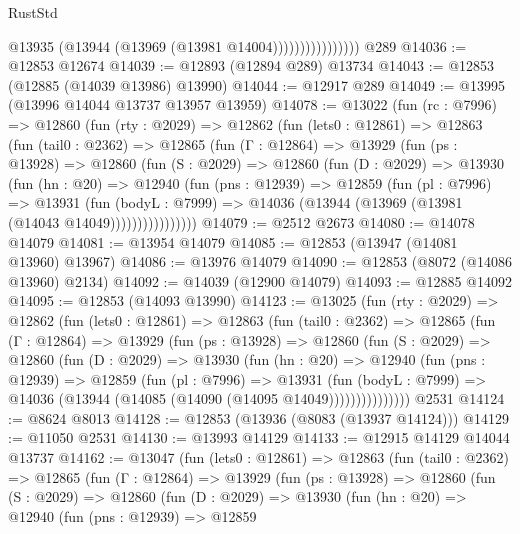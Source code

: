 \begin{lexlean}{RustStd}
\begin{coremodule}
                            @13935 (@13944 (@13969 (@13981 @14004))))))))))))))))
    @289
@14036 := @12853 @12674
@14039 := @12893 (@12894 @289) @13734
@14043 := @12853 (@12885 (@14039 @13986) @13990)
@14044 := @12917 @289
@14049 := @13995 (@13996 @14044 @13737 @13957 @13959)
@14078 := @13022
    (fun (rc : @7996) =>
    @12860
      (fun (rty : @2029) =>
      @12862
        (fun (lets0 : @12861) =>
        @12863
          (fun (tail0 : @2362) =>
          @12865
            (fun (Γ : @12864) =>
            @13929
              (fun (ps : @13928) =>
              @12860
                (fun (S : @2029) =>
                @12860
                  (fun (D : @2029) =>
                  @13930
                    (fun (hn : @20) =>
                    @12940
                      (fun (pns : @12939) =>
                      @12859
                        (fun (pl : @7996) =>
                        @13931
                          (fun (bodyL : @7999) =>
                          @14036 (@13944 (@13969 (@13981 (@14043 @14049))))))))))))))))
@14079 := @2512 @2673
@14080 := @14078 @14079
@14081 := @13954 @14079
@14085 := @12853 (@13947 (@14081 @13960) @13967)
@14086 := @13976 @14079
@14090 := @12853 (@8072 (@14086 @13960) @2134)
@14092 := @14039 (@12900 @14079)
@14093 := @12885 @14092
@14095 := @12853 (@14093 @13990)
@14123 := @13025
    (fun (rty : @2029) =>
    @12862
      (fun (lets0 : @12861) =>
      @12863
        (fun (tail0 : @2362) =>
        @12865
          (fun (Γ : @12864) =>
          @13929
            (fun (ps : @13928) =>
            @12860
              (fun (S : @2029) =>
              @12860
                (fun (D : @2029) =>
                @13930
                  (fun (hn : @20) =>
                  @12940
                    (fun (pns : @12939) =>
                    @12859
                      (fun (pl : @7996) =>
                      @13931
                        (fun (bodyL : @7999) =>
                        @14036 (@13944 (@14085 (@14090 (@14095 @14049)))))))))))))))
    @2531
@14124 := @8624 @8013
@14128 := @12853 (@13936 (@8083 (@13937 @14124)))
@14129 := @11050 @2531
@14130 := @13993 @14129
@14133 := @12915 @14129 @14044 @13737
@14162 := @13047
    (fun (lets0 : @12861) =>
    @12863
      (fun (tail0 : @2362) =>
      @12865
        (fun (Γ : @12864) =>
        @13929
          (fun (ps : @13928) =>
          @12860
            (fun (S : @2029) =>
            @12860
              (fun (D : @2029) =>
              @13930
                (fun (hn : @20) =>
                @12940
                  (fun (pns : @12939) =>
                  @12859

\end{coremodule}
\end{lexlean}
